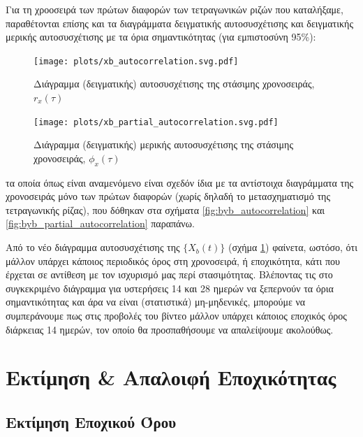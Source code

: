 Για τη χροοσειρά των πρώτων διαφορών των τετραγωνικών ριζών που καταλήξαμε, παραθέτονται επίσης και τα διαγράμματα δειγματικής αυτοσυσχέτισης και δειγματικής μερικής αυτοσυσχέτισης με τα όρια σημαντικότητας (για εμπιστοσύνη 95\%):

\begin{figure}[H]
    \begin{center}
        \texttt{[image: plots/xb\_autocorrelation.svg.pdf]}
        \caption{Διάγραμμα (δειγματικής) αυτοσυσχέτισης της στάσιμης χρονοσειράς, $r_x(\tau)$}
        \label{fig:xb_autocorrelation}
    \end{center}
\end{figure}

\begin{figure}[H]
    \begin{center}
        \texttt{[image: plots/xb\_partial\_autocorrelation.svg.pdf]}
        \caption{Διάγραμμα (δειγματικής) μερικής αυτοσυσχέτισης της στάσιμης χρονοσειράς, $\phi_x(\tau)$}
        \label{fig:xb_partial_autocorrelation}
    \end{center}
\end{figure}

τα οποία όπως είναι αναμενόμενο είναι σχεδόν ίδια με τα αντίστοιχα διαγράμματα της χρονοσειράς μόνο των πρώτων διαφορών (χωρίς δηλαδή το μετασχηματισμό της τετραγωνικής ρίζας), που δόθηκαν στα σχήματα \ref{fig:byb_autocorrelation} και \ref{fig:byb_partial_autocorrelation} παραπάνω.

\par Από το νέο διάγραμμα αυτοσυσχέτισης της $\{X_b(t)\}$ (σχήμα \ref{fig:xb_autocorrelation}) φαίνετα, ωστόσο, ότι μάλλον υπάρχει κάποιος περιοδικός όρος στη χρονοσειρά, ή εποχικότητα, κάτι που έρχεται σε αντίθεση με τον ισχυρισμό μας περί στασιμότητας. Βλέποντας τις  στο συγκεκριμένο διάγραμμα για υστερήσεις 14 και 28 ημερών να ξεπερνούν τα όρια σημαντικότητας και άρα να είναι (στατιστικά) μη-μηδενικές, μπορούμε να συμπεράνουμε πως στις προβολές του βίντεο  μάλλον υπάρχει κάποιος εποχικός όρος διάρκειας 14 ημερών, τον οποίο θα προσπαθήσουμε να απαλείψουμε ακολούθως. 

\section{Εκτίμηση \& Απαλοιφή Εποχικότητας}
\label{sec:step3-deseason}

\subsection{Εκτίμηση Εποχικού Όρου}

